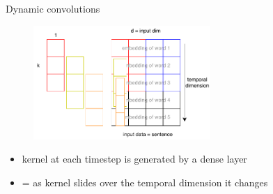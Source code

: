 \documentclass{beamer}
\begin{document}
\begin{frame}{Dynamic convolutions}

\begin{figure}[h]
\includegraphics[width=0.6\textwidth]{img/dynamic_conv}
\end{figure}

\begin{itemize}
\item kernel at each timestep is generated by a dense layer
\item = as kernel slides over the temporal dimension it changes
\end{itemize}

\end{frame}
\end{document}
